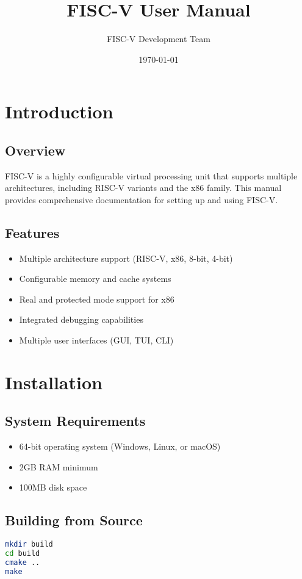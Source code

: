 \documentclass[a4paper,11pt]{book}
\title{FISC-V User Manual}
\author{FISC-V Development Team}
\date{\today}
\begin{document}
\frontmatter
\maketitle

\tableofcontents

\mainmatter

\chapter{Introduction}
\section{Overview}
FISC-V is a highly configurable virtual processing unit that supports multiple architectures, including RISC-V variants and the x86 family. This manual provides comprehensive documentation for setting up and using FISC-V.

\section{Features}
\begin{itemize}
    \item Multiple architecture support (RISC-V, x86, 8-bit, 4-bit)
    \item Configurable memory and cache systems
    \item Real and protected mode support for x86
    \item Integrated debugging capabilities
    \item Multiple user interfaces (GUI, TUI, CLI)
\end{itemize}

\chapter{Installation}
\section{System Requirements}
\begin{itemize}
    \item 64-bit operating system (Windows, Linux, or macOS)
    \item 2GB RAM minimum
    \item 100MB disk space
\end{itemize}

\section{Building from Source}
\begin{lstlisting}[language=bash]
mkdir build
cd build
cmake ..
make
\end{lstlisting}
\end{document}
